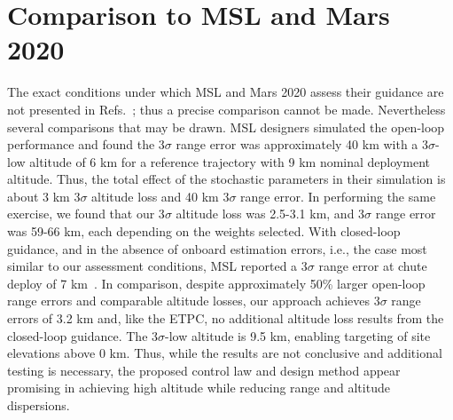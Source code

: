 \section{Comparison to MSL and Mars 2020}
The exact conditions under which MSL and Mars 2020 assess their guidance are not presented in Refs.~\cite{MSL_EDL2,M2020_EDL}; thus a precise comparison cannot be made. Nevertheless several comparisons that may be drawn. MSL designers simulated the open-loop performance and found the 3$\sigma$ range error was approximately 40 km with a 3$\sigma$-low altitude of 6 km for a reference trajectory with 9 km nominal deployment altitude. Thus, the total effect of the stochastic parameters in their simulation is about 3 km 3$\sigma$ altitude loss and 40 km 3$\sigma$ range error. In performing the same exercise, we found that our 3$\sigma$ altitude loss was 2.5-3.1 km, and 3$\sigma$ range error was 59-66 km, each depending on the weights selected. With closed-loop guidance, and in the absence of onboard estimation errors, i.e., the case most similar to our assessment conditions, MSL reported a 3$\sigma$ range error at chute deploy of 7 km~\cite{MSL_EDL2}. In comparison, despite approximately 50\% larger open-loop range errors and comparable altitude losses, our approach achieves 3$\sigma$ range errors of 3.2 km and, like the ETPC, no additional altitude loss results from the closed-loop guidance. The 3$\sigma$-low altitude is 9.5 km, enabling targeting of site elevations above 0 km. Thus, while the results are not conclusive and additional testing is necessary, the proposed control law and design method appear promising in achieving high altitude while reducing range and altitude dispersions. 




